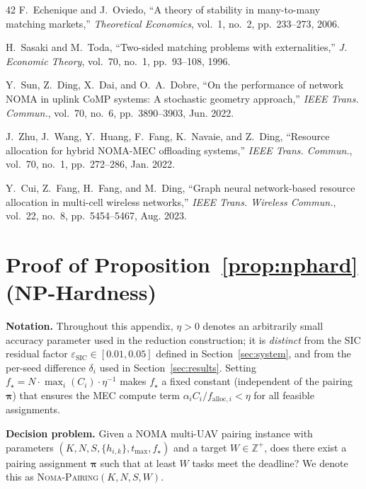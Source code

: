 \documentclass[journal]{IEEEtran}
\begin{document}
\begin{thebibliography}{42}
 F.~Echenique and J.~Oviedo, ``A theory of stability in many-to-many matching markets,'' \emph{Theoretical Economics}, vol.~1, no.~2, pp.~233--273, 2006.

 H.~Sasaki and M.~Toda, ``Two-sided matching problems with externalities,'' \emph{J. Economic Theory}, vol.~70, no.~1, pp.~93--108, 1996.

 Y.~Sun, Z.~Ding, X.~Dai, and O.~A.~Dobre, ``On the performance of network NOMA in uplink CoMP systems: A stochastic geometry approach,'' \emph{IEEE Trans. Commun.}, vol.~70, no.~6, pp.~3890--3903, Jun. 2022.

 J.~Zhu, J.~Wang, Y.~Huang, F.~Fang, K.~Navaie, and Z.~Ding, ``Resource allocation for hybrid NOMA-MEC offloading systems,'' \emph{IEEE Trans. Commun.}, vol.~70, no.~1, pp.~272--286, Jan. 2022.

 Y.~Cui, Z.~Fang, H.~Fang, and M.~Ding, ``Graph neural network-based resource allocation in multi-cell wireless networks,'' \emph{IEEE Trans. Wireless Commun.}, vol.~22, no.~8, pp.~5454--5467, Aug. 2023.

\end{thebibliography}

\appendix
\section{Proof of Proposition~\ref{prop:nphard} (NP-Hardness)}
\label{app:np_hard}

\textbf{Notation.}
Throughout this appendix, $\eta > 0$ denotes an arbitrarily small accuracy parameter used in the reduction construction; it is \emph{distinct} from the SIC residual factor $\varepsilon_{\text{SIC}} \in [0.01, 0.05]$ defined in Section~\ref{sec:system}, and from the per-seed difference $\delta_i$ used in Section~\ref{sec:results}.
Setting $f_{\star} = N \cdot \max_i(C_i) \cdot \eta^{-1}$ makes $f_{\star}$ a fixed constant (independent of the pairing $\boldsymbol{\pi}$) that ensures the MEC compute term $\alpha_i C_i / f_{\text{alloc},i} < \eta$ for all feasible assignments.

\textbf{Decision problem.}
Given a NOMA multi-UAV pairing instance with parameters $(K, N, S, \{h_{i,k}\}, t_{\max}, f_{\star})$ and a target $W \in \mathbb{Z}^+$, does there exist a pairing assignment $\boldsymbol{\pi}$ such that at least $W$ tasks meet the deadline?
We denote this as \textsc{Noma-Pairing}$(K,N,S,W)$.
\end{document}

